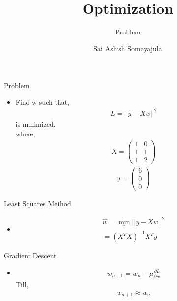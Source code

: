 \documentclass{beamer}
\title{Optimization}
\subtitle{Problem}
\author{Sai Ashish Somayajula\inst{1}}
\institute[Universities of Somewhere and Elsewhere] %
{
  \inst{1}%
  EE16BTECH11043
  }
\begin{document}
\begin{frame}
  \titlepage
\end{frame}




\begin{frame}{Problem}
  \begin{itemize}
  \item {
Find w such that,  \begin{align}
  L = {||y-Xw||}^2
 \end{align} is minimized.
\\where,
 \begin{align}
 X = 
\begin{pmatrix}
		1 & 0 \\ 1 & 1 \\ 1 & 2 
		\end{pmatrix}
 \end{align}
 \begin{align}
  y = \begin{pmatrix}
		6\\0\\0
		\end{pmatrix}
 \end{align}

  }
  \end{itemize}
  
\end{frame}

\begin{frame}{Least Squares Method}
    \begin{itemize}
  \item {
\begin{align}
 \widehat{w} =\min_x {||y-Xw||}^{2}
\\= {(X^{T}X)}^{-1}X^{T}y
 \end{align}  
  

  }
  \end{itemize}
 
\end{frame}

\begin{frame}{Gradient Descent}

\begin{itemize}
  \item {
 \begin{align}
w_{n+1} = w_{n} - \mu \frac{\partial L}{\partial w}
 \end{align}
 Till,
 \begin{align}
  w_{n+1} \approx w_{n}
 \end{align}

  }
 \end{itemize}
  
\end{frame}
\end{document}
